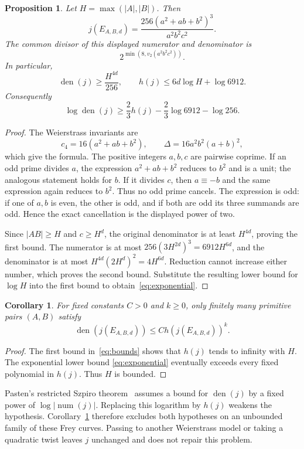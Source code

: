 \documentclass[11pt,a4paper]{article}
\newtheorem{proposition}[theorem]{Proposition}
\newtheorem{corollary}[theorem]{Corollary}
\DeclareMathOperator{\den}{den}
\begin{document}
\begin{proposition}\label{prop:den}
Let $H=\max(|A|,|B|)$. Then
\[
 j(E_{A,B,d})=\frac{256(a^2+ab+b^2)^3}{a^2b^2c^2}.
\]
The common divisor of this displayed numerator and denominator is
\[
 2^{\min(8,v_2(a^2b^2c^2))}.
\]
In particular,
\begin{equation}\label{eq:bounds}
 \den(j)\ge\frac{H^{4d}}{256},\qquad
 h(j)\le6d\log H+\log6912.
\end{equation}
Consequently
\begin{equation}\label{eq:exponential}
 \log\den(j)\ge\frac23h(j)
                  -\frac23\log6912-\log256.
\end{equation}
\end{proposition}
\begin{proof}
The Weierstrass invariants are
\[
 c_4=16(a^2+ab+b^2),\qquad
 \Delta=16a^2b^2(a+b)^2,
\]
which give the formula. The positive integers $a,b,c$ are pairwise
coprime. If an odd prime divides $a$, the expression $a^2+ab+b^2$
reduces to $b^2$ and is a unit; the analogous statement holds for $b$.
If it divides $c$, then $a\equiv-b$ and the same expression again
reduces to $b^2$. Thus no odd prime cancels. The expression is odd:
if one of $a,b$ is even, the other is odd, and if both are odd its
three summands are odd. Hence the exact cancellation is the displayed
power of two.

Since $|AB|\ge H$ and $c\ge H^d$, the original denominator is at
least $H^{4d}$, proving the first bound. The numerator is at most
$256(3H^{2d})^3=6912H^{6d}$, and the denominator is at most
$H^{4d}(2H^d)^2=4H^{6d}$. Reduction cannot increase either number,
which proves the second bound. Substitute the resulting lower bound
for $\log H$ into the first bound to obtain~\eqref{eq:exponential}.
\end{proof}

\begin{corollary}\label{cor:finite}
For fixed constants $C>0$ and $k\ge0$, only finitely many primitive
pairs $(A,B)$ satisfy
\[
                    \den(j(E_{A,B,d}))\le C h(j(E_{A,B,d}))^k.
\]
\end{corollary}
\begin{proof}
The first bound in~\eqref{eq:bounds} shows that $h(j)$ tends to
infinity with $H$. The exponential lower bound
\eqref{eq:exponential} eventually exceeds every fixed polynomial
in $h(j)$. Thus $H$ is bounded.
\end{proof}

Pasten's restricted Szpiro theorem~\cite[Theorem 1.2]{PastenSmall}
assumes a bound for $\den(j)$ by a fixed power of
$\log|\operatorname{num}(j)|$. Replacing this logarithm by $h(j)$
weakens the hypothesis. Corollary~\ref{cor:finite}
therefore excludes both hypotheses on an unbounded family of these
Frey curves. Passing to another Weierstrass model or taking a quadratic
twist leaves $j$ unchanged and does not repair this problem.
\end{document}
